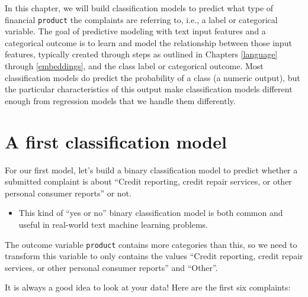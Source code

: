 \documentclass[
]{krantz}
\makeatletter
\newenvironment{Shaded}{\begin{snugshade}}{\end{snugshade}}
\newcommand{\FunctionTok}[1]{\textcolor[rgb]{0.00,0.00,0.00}{#1}}
\newcommand{\NormalTok}[1]{#1}
\newcommand{\SpecialCharTok}[1]{\textcolor[rgb]{0.00,0.00,0.00}{#1}}
\newenvironment{kframe}{%
\medskip{}
\setlength{\fboxsep}{.8em}
 \def\at@end@of@kframe{}%
 \ifinner\ifhmode%
  \def\at@end@of@kframe{\end{minipage}}%
  \begin{minipage}{\columnwidth}%
 \fi\fi%
 \def\FrameCommand##1{\hskip\@totalleftmargin \hskip-\fboxsep
 \colorbox{shadecolor}{##1}\hskip-\fboxsep
     \hskip-\linewidth \hskip-\@totalleftmargin \hskip\columnwidth}%
 \MakeFramed {\advance\hsize-\width
   \@totalleftmargin\z@ \linewidth\hsize
   \@setminipage}}%
 {\par\unskip\endMakeFramed%
 \at@end@of@kframe}
\renewenvironment{Shaded}{\begin{kframe}}{\end{kframe}}
\newenvironment{rmdblock}[1]
  {\begin{shaded*}
  \begin{itemize}[left = -1cm, labelsep = 1cm]
  \renewcommand{\labelitemi}{
    \raisebox{-.7\height}[0pt][0pt]{
      {\setkeys{Gin}{width=3em,keepaspectratio}\texttt{[image: images/\#1]}}
    }
  }
 
  \item
  }
  {
  \end{itemize}
  \end{shaded*}
  }
\newenvironment{rmdnote}
  {\begin{rmdblock}{note}}
  {\end{rmdblock}}
\makeatother
\begin{document}
In this chapter, we will build classification models to predict what type of financial \texttt{product} the complaints are referring to, i.e., a label or categorical variable. The goal of predictive modeling with text input features and a categorical outcome is to learn and model the relationship between those input features, typically created through steps as outlined in Chapters \ref{language} through \ref{embeddings}, and the class label or categorical outcome. Most classification models do predict the probability of a class (a numeric output), but the particular characteristics of this output make classification models different enough from regression models that we handle them differently.

\hypertarget{classfirstattemptlookatdata}{%
\section{A first classification model}\label{classfirstattemptlookatdata}}

For our first model, let's build a binary classification model to predict whether a submitted complaint is about ``Credit reporting, credit repair services, or other personal consumer reports'' or not.

\begin{rmdnote}
This kind of ``yes or no'' binary classification model is both common
and useful in real-world text machine learning problems.
\end{rmdnote}

The outcome variable \texttt{product} contains more categories than this, so we need to transform this variable to only contains the values ``Credit reporting, credit repair services, or other personal consumer reports'' and ``Other''.

It is always a good idea to look at your data! Here are the first six complaints:

\begin{Shaded}
\end{Shaded}
\end{document}
